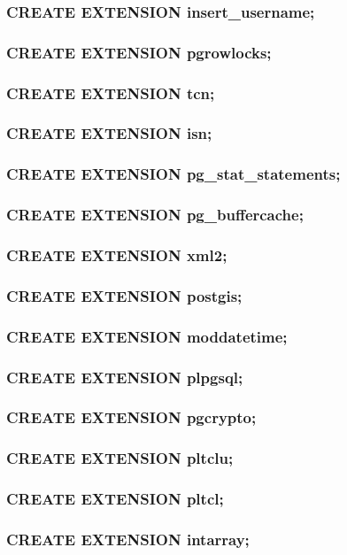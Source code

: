 \documentclass[utf8,hyperref={pdftex,colorlinks,linkcolor=black,citecolor=black,urlcolor=black,filecolor=black,plainpages=false},xcolor=table,hyperref]{beamer}
\begin{document}
\begin{frame}
	\frametitle{CREATE EXTENSION insert_username;}
\end{frame}

\begin{frame}
	\frametitle{CREATE EXTENSION pgrowlocks;}
\end{frame}

\begin{frame}
	\frametitle{CREATE EXTENSION tcn;}
\end{frame}

\begin{frame}
	\frametitle{CREATE EXTENSION isn;}
\end{frame}

\begin{frame}
	\frametitle{CREATE EXTENSION pg_stat_statements;}
\end{frame}

\begin{frame}
	\frametitle{CREATE EXTENSION pg_buffercache;}
\end{frame}

\begin{frame}
	\frametitle{CREATE EXTENSION xml2;}
\end{frame}

\begin{frame}
	\frametitle{CREATE EXTENSION postgis;}
\end{frame}

\begin{frame}
	\frametitle{CREATE EXTENSION moddatetime;}
\end{frame}

\begin{frame}
	\frametitle{CREATE EXTENSION plpgsql;}
\end{frame}

\begin{frame}
	\frametitle{CREATE EXTENSION pgcrypto;}
\end{frame}

\begin{frame}
	\frametitle{CREATE EXTENSION pltclu;}
\end{frame}

\begin{frame}
	\frametitle{CREATE EXTENSION pltcl;}
\end{frame}

\begin{frame}
	\frametitle{CREATE EXTENSION intarray;}
\end{frame}
\end{document}
